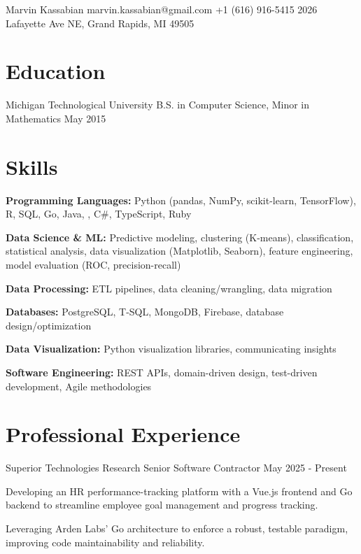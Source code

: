 \documentclass{../styles/cv}
\begin{document}
\resumeheadersimpler
    {Marvin Kassabian}
    {marvin.kassabian@gmail.com}
    {+1 (616) 916-5415}
    {2026 Lafayette Ave NE, Grand Rapids, MI 49505}

\section{Education}
\subsectionlocationdate
    {Michigan Technological University}
    {B.S. in Computer Science, Minor in Mathematics}
    {May 2015}


\section{Skills}
\resumesublistbegin
    \item \textbf{Programming Languages:} Python (pandas, NumPy, scikit-learn, TensorFlow), R, SQL, Go, Java, \cpp, C\#, TypeScript, Ruby
    \item \textbf{Data Science \& ML:} Predictive modeling, clustering (K-means), classification, statistical analysis, data visualization (Matplotlib, Seaborn), feature engineering, model evaluation (ROC, precision-recall)
    \item \textbf{Data Processing:} ETL pipelines, data cleaning/wrangling, data migration
    \item \textbf{Databases:} PostgreSQL, T-SQL, MongoDB, Firebase, database design/optimization
    \item \textbf{Data Visualization:} Python visualization libraries, communicating insights
    \item \textbf{Software Engineering:} REST APIs, domain-driven design, test-driven development, Agile methodologies
\resumesublistend

\section{Professional Experience}

\subsectionpositiondate
    {Superior Technologies Research}
    {Senior Software Contractor}
    {May 2025 - Present}
\resumesublistbegin
    \item Developing an HR performance-tracking platform with a Vue.js frontend and Go backend to streamline employee goal management and progress tracking.
    \item Leveraging Arden Labs' Go architecture to enforce a robust, testable paradigm, improving code maintainability and reliability.
\resumesublistend
\end{document}
